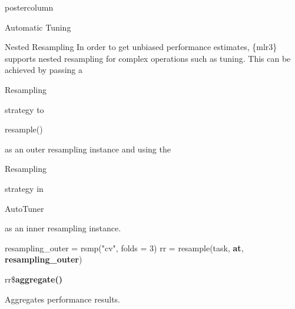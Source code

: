 \documentclass{beamer}
\newcommand{\codeinline}[1]{\begin{codeboxinline}#1\end{codeboxinline}}
\begin{document}
\begin{frame}[fragile]{}
\begin{columns}
\begin{column}{.245\textwidth}
\begin{beamercolorbox}[center]{postercolumn}
\begin{minipage}{.98\textwidth}
{\begin{myblock}{Automatic Tuning}
						\end{myblock}
						\begin{myblock}{Nested Resampling}
							In order to get unbiased performance estimates, 
							\{mlr3\} supports nested resampling for complex operations such as tuning.
							This can be achieved by passing a \codeinline{Resampling} strategy to
							\codeinline{resample()} as an outer resampling instance and using the 
							\codeinline{Resampling} strategy in \codeinline{AutoTuner} as an 
							inner resampling instance.
							\\
							\begin{codeboxmultiline}[width=26.5cm]
								resampling\_outer = rsmp("cv", folds = 3)
								rr = resample(task, \textbf{at}, \textbf{resampling\_outer})
							\end{codeboxmultiline}
							\vspace{1em}
							\begin{codebox}
								rr\$\textbf{aggregate()}
							\end{codebox}
							Aggregates performance results.
						\end{myblock}
						\vfill}
				\end{minipage}
			\end{beamercolorbox}
		\end{column}
	\end{columns}
\end{frame}
\end{document}

